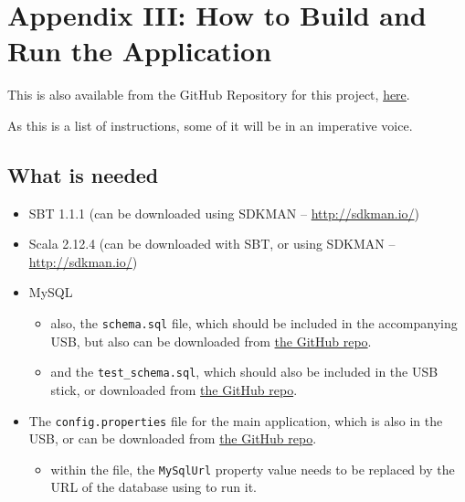 \section{Appendix III: How to Build and Run the Application} \label{appendix3}

This is also available from the GitHub Repository for this project,
\href{https://github.com/claudiusbr/personal_finance_system}{here}.

As this is a list of instructions, some of it will be in an imperative voice.

\subsection{What is needed}
\begin{itemize}
  \item
    SBT 1.1.1 (can be downloaded using SDKMAN -- \href{http://sdkman.io/}{http://sdkman.io/})

  \item
    Scala 2.12.4 (can be downloaded with SBT, or using SDKMAN -- 
    \href{http://sdkman.io/}{http://sdkman.io/})

  \item
    MySQL
    \begin{itemize}
      \item
        also, the \texttt{schema.sql} file, which should be included in the
        accompanying USB, but also can be downloaded from
        \href{https://github.com/claudiusbr/personal_finance_system/tree/master/code/original_db_schemas/mysql}{the
        GitHub repo}.

      \item
        and the \texttt{test\_schema.sql}, which should also be included in the
        USB stick, or downloaded from
        \href{https://github.com/claudiusbr/personal_finance_system/tree/master/code/original_db_schemas/mysql}{the
        GitHub repo}.
    \end{itemize}

  \item
    The \texttt{config.properties} file for the main application, which is also
    in the USB, or can be downloaded from
    \href{https://github.com/claudiusbr/personal_finance_system/tree/master/code}{the
    GitHub repo}.
    \begin{itemize}
      \item
        within the file, the \texttt{MySqlUrl} property value needs to be
        replaced by the URL of the database using to run it.
    \end{itemize}



\end{itemize}
